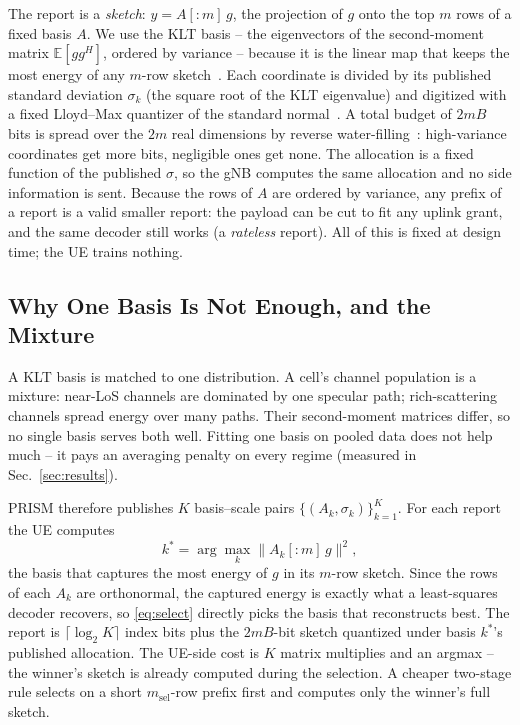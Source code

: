 \documentclass[conference]{IEEEtran}
\begin{document}
The report is a \emph{sketch}: $y = A[{:}m]\,g$, the projection of $g$ onto the top $m$ rows of a fixed basis $A$. We use the KLT basis -- the eigenvectors of the second-moment matrix $\mathbb{E}[gg^H]$, ordered by variance -- because it is the linear map that keeps the most energy of any $m$-row sketch~\cite{eckartyoung1936}. Each coordinate is divided by its published standard deviation $\sigma_k$ (the square root of the KLT eigenvalue) and digitized with a fixed Lloyd--Max quantizer of the standard normal~\cite{lloyd1982,max1960}. A total budget of $2mB$ bits is spread over the $2m$ real dimensions by reverse water-filling~\cite{coverthomas2006,gershogray1992}: high-variance coordinates get more bits, negligible ones get none. The allocation is a fixed function of the published $\sigma$, so the gNB computes the same allocation and no side information is sent. Because the rows of $A$ are ordered by variance, any prefix of a report is a valid smaller report: the payload can be cut to fit any uplink grant, and the same decoder still works (a \emph{rateless} report). All of this is fixed at design time; the UE trains nothing.

\subsection{Why One Basis Is Not Enough, and the Mixture}
A KLT basis is matched to one distribution. A cell's channel population is a mixture: near-LoS channels are dominated by one specular path; rich-scattering channels spread energy over many paths. Their second-moment matrices differ, so no single basis serves both well. Fitting one basis on pooled data does not help much -- it pays an averaging penalty on every regime (measured in Sec.~\ref{sec:results}).

PRISM therefore publishes $K$ basis--scale pairs $\{(A_k,\sigma_k)\}_{k=1}^{K}$. For each report the UE computes
\begin{equation}
k^{*} = \arg\max_{k} \bigl\lVert A_k[{:}m]\, g \bigr\rVert^2 ,
\label{eq:select}
\end{equation}
the basis that captures the most energy of $g$ in its $m$-row sketch. Since the rows of each $A_k$ are orthonormal, the captured energy is exactly what a least-squares decoder recovers, so \eqref{eq:select} directly picks the basis that reconstructs best. The report is $\lceil\log_2 K\rceil$ index bits plus the $2mB$-bit sketch quantized under basis $k^*$'s published allocation. The UE-side cost is $K$ matrix multiplies and an argmax -- the winner's sketch is already computed during the selection. A cheaper two-stage rule selects on a short $m_{\mathrm{sel}}$-row prefix first and computes only the winner's full sketch.
\end{document}

